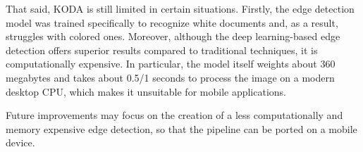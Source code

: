 \documentclass[a4paper]{article}
\begin{document}
That said, KODA is still limited in certain situations. Firstly, the edge detection model was trained specifically to recognize white documents and, as a result, struggles with colored ones.
Moreover, although the deep learning-based edge detection offers superior results compared to traditional techniques, it is computationally expensive. In particular, the model itself weights about 360 megabytes and takes about 0.5/1 seconds to process the image on a modern desktop CPU, which makes it unsuitable for mobile applications.

Future improvements may focus on the creation of a less computationally and memory expensive edge detection, so that the pipeline can be ported on a mobile device.
\end{document}
